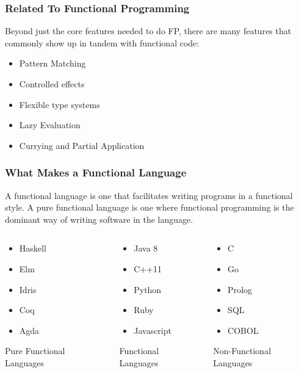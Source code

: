\documentclass{beamer}
\begin{document}
\begin{frame}
  \frametitle{Related To Functional Programming}
  Beyond just the core features needed to do FP, there are many
  features that commonly show up in tandem with functional code:
  \begin{itemize}
    \item Pattern Matching
    \item Controlled effects
    \item Flexible type systems
    \item Lazy Evaluation
    \item Currying and Partial Application
  \end{itemize}
\end{frame}

\begin{frame}
  \frametitle{What Makes a Functional Language}
  A functional language is one that facilitates writing programs in a
  functional style.  A pure functional language is one where
  functional programming is the dominant way of writing software in
  the language.
  \begin{columns}
    \begin{column}{0.3\textwidth}
      \begin{itemize}
      \item Haskell
      \item Elm
      \item Idris
      \item Coq
      \item Agda
      \end{itemize}
      Pure Functional Languages
    \end{column}
    \begin{column}{0.3\textwidth}
      \begin{itemize}
      \item Java 8
      \item C++11
      \item Python
      \item Ruby
      \item Javascript
      \end{itemize}
      Functional Languages
    \end{column}
    \begin{column}{0.3\textwidth}
      \begin{itemize}
      \item C
      \item Go
      \item Prolog
      \item SQL
      \item COBOL
      \end{itemize}
      Non-Functional Languages
    \end{column}
  \end{columns}
\end{frame}
\end{document}
